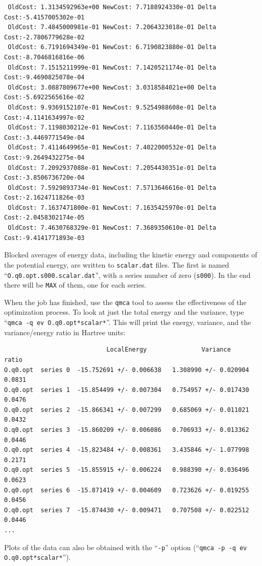 \begin{shaded}
\begin{verbatim}
 OldCost: 1.3134592963e+00 NewCost: 7.7188924330e-01 Delta Cost:-5.4157005302e-01
 OldCost: 7.4845000981e-01 NewCost: 7.2064323018e-01 Delta Cost:-2.7806779628e-02
 OldCost: 6.7191694349e-01 NewCost: 6.7190823880e-01 Delta Cost:-8.7046816816e-06
 OldCost: 7.1515211999e-01 NewCost: 7.1420521174e-01 Delta Cost:-9.4690825078e-04
 OldCost: 3.0887809677e+00 NewCost: 3.0318584021e+00 Delta Cost:-5.6922565616e-02
 OldCost: 9.9369152107e-01 NewCost: 9.5254988608e-01 Delta Cost:-4.1141634997e-02
 OldCost: 7.1198030212e-01 NewCost: 7.1163560440e-01 Delta Cost:-3.4469771549e-04
 OldCost: 7.4114649965e-01 NewCost: 7.4022000532e-01 Delta Cost:-9.2649432275e-04
 OldCost: 7.2092937088e-01 NewCost: 7.2054430351e-01 Delta Cost:-3.8506736720e-04
 OldCost: 7.5929893734e-01 NewCost: 7.5713646616e-01 Delta Cost:-2.1624711826e-03
 OldCost: 7.1637471800e-01 NewCost: 7.1635425970e-01 Delta Cost:-2.0458302174e-05
 OldCost: 7.4630768329e-01 NewCost: 7.3689350610e-01 Delta Cost:-9.4141771893e-03
\end{verbatim}
\end{shaded}

Blocked averages of energy data, including the kinetic energy and components of the potential energy, are written to \texttt{scalar.dat} files.  The first is named ``\texttt{O.q0.opt.s000.scalar.dat}'', with a series number of zero (\texttt{s000}).  In the end there will be \texttt{MAX} of them, one for each series. 

When the job has finished, use the \texttt{qmca} tool to assess the effectiveness of the optimization process.  To look at just the total energy and the variance, type ``\verb|qmca -q ev O.q0.opt*scalar*|''.  This will print the energy, variance, and the variance/energy ratio in Hartree units:
\begin{shaded}
\begin{verbatim}
                            LocalEnergy               Variance           ratio 
O.q0.opt  series 0  -15.752691 +/- 0.006638   1.308990 +/- 0.020904   0.0831 
O.q0.opt  series 1  -15.854499 +/- 0.007304   0.754957 +/- 0.017430   0.0476 
O.q0.opt  series 2  -15.866341 +/- 0.007299   0.685069 +/- 0.011021   0.0432 
O.q0.opt  series 3  -15.860209 +/- 0.006086   0.706933 +/- 0.013362   0.0446 
O.q0.opt  series 4  -15.823484 +/- 0.008361   3.435846 +/- 1.077998   0.2171 
O.q0.opt  series 5  -15.855915 +/- 0.006224   0.988390 +/- 0.036496   0.0623 
O.q0.opt  series 6  -15.871419 +/- 0.004609   0.723626 +/- 0.019255   0.0456 
O.q0.opt  series 7  -15.874430 +/- 0.009471   0.707508 +/- 0.022512   0.0446 
...
\end{verbatim}
\end{shaded}
\noindent
Plots of the data can also be obtained with the ``\texttt{-p}'' option (``\verb|qmca -p -q ev O.q0.opt*scalar*|'').

